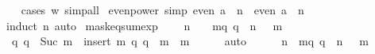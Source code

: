 \begin{isabellebody}
%
\isadelimproof
\ \ %
\endisadelimproof
%
\isatagproof
{}\isamarkupfalse%
\ {\isacharparenleft}{\kern0pt}cases\ w{\isacharparenright}{\kern0pt}\ simp{\isacharunderscore}{\kern0pt}all%
\endisatagproof
{\isafoldproof}%
%
\isadelimproof
\isanewline
%
\endisadelimproof
\isanewline
{}\isamarkupfalse%
\ even{\isacharunderscore}{\kern0pt}power\ {\isacharbrackleft}{\kern0pt}simp{\isacharbrackright}{\kern0pt}{\isacharcolon}{\kern0pt}\ {\isachardoublequoteopen}even\ {\isacharparenleft}{\kern0pt}a\ {\isacharcircum}{\kern0pt}\ n{\isacharparenright}{\kern0pt}\ {\isasymlongleftrightarrow}\ even\ a\ {\isasymand}\ n\ {\isachargreater}{\kern0pt}\ {}{\isachardoublequoteclose}\isanewline
%
\isadelimproof
\ \ %
\endisadelimproof
%
\isatagproof
{}\isamarkupfalse%
\ {\isacharparenleft}{\kern0pt}induct\ n{\isacharparenright}{\kern0pt}\ auto%
\endisatagproof
{\isafoldproof}%
%
\isadelimproof
\isanewline
%
\endisadelimproof
\isanewline
{}\isamarkupfalse%
\ mask{\isacharunderscore}{\kern0pt}eq{\isacharunderscore}{\kern0pt}sum{\isacharunderscore}{\kern0pt}exp{\isacharcolon}{\kern0pt}\isanewline
\ \ {\isacartoucheopen}{}\ {\isacharcircum}{\kern0pt}\ n\ {\isacharminus}{\kern0pt}\ {}\ {\isacharequal}{\kern0pt}\ {\isacharparenleft}{\kern0pt}{\isasymSum}m{\isasymin}{\isacharbraceleft}{\kern0pt}q{\isachardot}{\kern0pt}\ q\ {\isacharless}{\kern0pt}\ n{\isacharbraceright}{\kern0pt}{\isachardot}{\kern0pt}\ {}\ {\isacharcircum}{\kern0pt}\ m{\isacharparenright}{\kern0pt}{\isacartoucheclose}\isanewline
%
\isadelimproof
%
\endisadelimproof
%
\isatagproof
{}\isamarkupfalse%
\ {\isacharminus}{\kern0pt}\isanewline
\ \ \isamarkupfalse%
\ {\isacharasterisk}{\kern0pt}{\isacharcolon}{\kern0pt}\ {\isacartoucheopen}{\isacharbraceleft}{\kern0pt}q{\isachardot}{\kern0pt}\ q\ {\isacharless}{\kern0pt}\ Suc\ m{\isacharbraceright}{\kern0pt}\ {\isacharequal}{\kern0pt}\ insert\ m\ {\isacharbraceleft}{\kern0pt}q{\isachardot}{\kern0pt}\ q\ {\isacharless}{\kern0pt}\ m{\isacharbraceright}{\kern0pt}{\isacartoucheclose}\ \ m\isanewline
\ \ \ \ \isamarkupfalse%
\ auto\isanewline
\ \ \isamarkupfalse%
\ {\isacartoucheopen}{}\ {\isacharcircum}{\kern0pt}\ n\ {\isacharequal}{\kern0pt}\ {\isacharparenleft}{\kern0pt}{\isasymSum}m{\isasymin}{\isacharbraceleft}{\kern0pt}q{\isachardot}{\kern0pt}\ q\ {\isacharless}{\kern0pt}\ n{\isacharbraceright}{\kern0pt}{\isachardot}{\kern0pt}\ {}\ {\isacharcircum}{\kern0pt}\ m{\isacharparenright}{\kern0pt}\ {\isacharplus}{\kern0pt}\ {}{\isacartoucheclose}\isanewline

\end{isabellebody}
